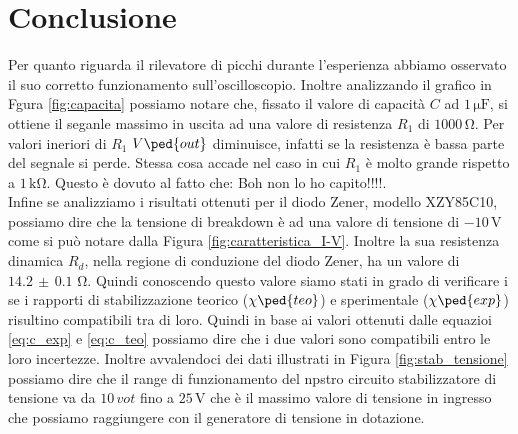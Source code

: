 \section*{Conclusione}

Per quanto riguarda il rilevatore di picchi durante l'esperienza abbiamo osservato il suo corretto funzionamento sull'oscilloscopio. Inoltre analizzando il grafico in Fgura \ref{fig:capacita} possiamo notare che, fissato il valore di capacità $C$ ad $1\,\si{\micro\farad}$, si ottiene il seganle massimo in uscita ad una valore di resistenza $R_1$ di $1000\,\si{\ohm}$. Per valori ineriori di $R_1$ $V\ped{out}$ diminuisce, infatti se la resistenza è bassa parte del segnale si perde. Stessa cosa accade nel caso in cui $R_1$ è molto grande rispetto a $1\,\si{\kilo\ohm}$. Questo è dovuto al fatto che: Boh non lo ho capito!!!!.\\

Infine se analizziamo i risultati ottenuti per il diodo Zener, modello XZY85C10, possiamo dire che la tensione di breakdown è ad una valore di tensione di $-10\,\si{\volt}$ come si può notare dalla Figura \ref{fig:caratteristica_I-V}. Inoltre la sua resistenza dinamica $R_d$, nella regione di conduzione del diodo Zener, ha un valore di $14.2\,\pm\,0.1\,\,\si{\ohm}$. Quindi conoscendo questo valore siamo stati in grado di verificare i se i rapporti di stabilizzazione teorico ($\chi\ped{teo}$) e sperimentale ($\chi\ped{exp}$) risultino compatibili tra di loro. Quindi in base ai valori ottenuti dalle equazioi \ref{eq:c_exp} e \ref{eq:c_teo} possiamo dire che i due valori sono compatibili entro le loro incertezze.
Inoltre avvalendoci dei dati illustrati in Figura \ref{fig:stab_tensione} possiamo dire che il range di funzionamento del npstro circuito stabilizzatore di tensione va da $10\,\si{vot}$ fino a $25\,\si{\volt}$ che è il massimo valore di tensione in ingresso che possiamo raggiungere con il generatore di tensione in dotazione. 
